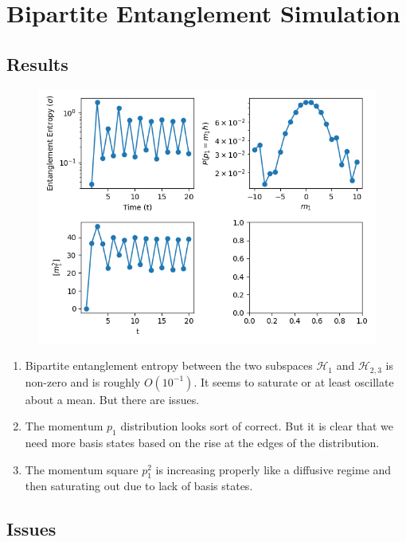 \documentclass[12pt]{article}
\begin{document}
\newpage

\section{Bipartite Entanglement Simulation}
\subsection{Results}

\begin{figure}[h]
\includegraphics[width=\linewidth]{entanglement_entropy}
\centering
\end{figure}

\begin{enumerate}
    \item Bipartite entanglement entropy between the two subspaces
    $\mathcal{H}_1$ and $\mathcal{H}_{2,3}$ is non-zero and is roughly
    $O(10^{-1})$. It seems to saturate or at least oscillate about a
    mean. But there are issues.

    \item The momentum $p_1$ distribution looks sort of correct. But it
    is clear that we need more basis states based on the rise at the
    edges of the distribution.

    \item The momentum square $p_1^2$ is increasing properly like a
    diffusive regime and then saturating out due to lack of basis states.
\end{enumerate}

\subsection{Issues}
\end{document}
